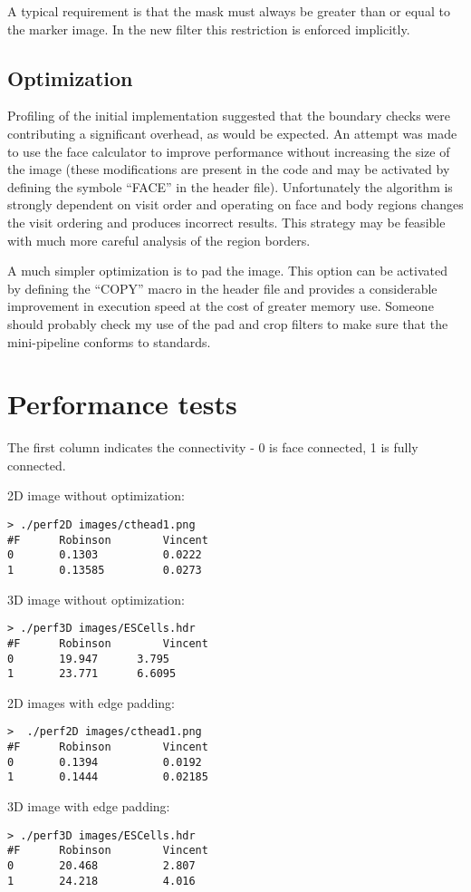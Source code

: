 \documentclass{InsightArticle}
\begin{document}
A typical requirement is that the mask must always be greater than or
equal to the marker image. In the new filter this restriction is
enforced implicitly.

\subsection{Optimization}
Profiling of the initial implementation suggested that the boundary
checks were contributing a significant overhead, as would be
expected. An attempt was made to use the face calculator to improve
performance without increasing the size of the image (these
modifications are present in the code and may be activated by defining
the symbole ``FACE'' in the header file). Unfortunately the algorithm
is strongly dependent on visit order and operating on face and body
regions changes the visit ordering and produces incorrect
results. This strategy may be feasible with much more careful analysis
of the region borders.

A much simpler optimization is to pad the image. This option can be
activated by defining the ``COPY'' macro in the header file and
provides a considerable improvement in execution speed at the cost of
greater memory use. Someone should probably check my use of the pad
and crop filters to make sure that the mini-pipeline conforms to
standards.
\section{Performance tests}
The first column indicates the connectivity - 0 is face connected, 1
is fully connected.

2D image without optimization:
\begin{verbatim}
> ./perf2D images/cthead1.png
#F      Robinson        Vincent
0       0.1303          0.0222
1       0.13585         0.0273
\end{verbatim}

3D image without optimization:
\begin{verbatim}
> ./perf3D images/ESCells.hdr
#F      Robinson        Vincent
0       19.947  	3.795
1       23.771  	6.6095
\end{verbatim}

2D images with edge padding:
\begin{verbatim}
>  ./perf2D images/cthead1.png
#F      Robinson        Vincent
0       0.1394          0.0192
1       0.1444          0.02185
\end{verbatim}
3D image with edge padding:
\begin{verbatim}
> ./perf3D images/ESCells.hdr
#F      Robinson        Vincent
0       20.468          2.807
1       24.218          4.016
\end{verbatim}
\end{document}
